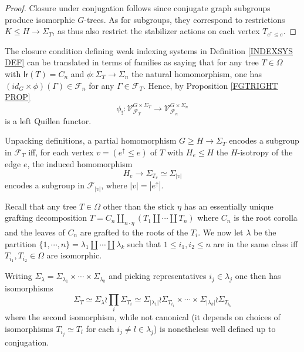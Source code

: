 \documentclass[a4paper,10pt]{article}%
\begin{document}
\begin{proof}
	Closure under conjugation follows since conjugate graph subgroups produce isomorphic $G$-trees.
	As for subgroups, they correspond to restrictions $K \leq H \to \Sigma_T$,
	as thus also restrict the stabilizer actions on each vertex $T_{e^{\uparrow} \leq e}$.
\end{proof}

\begin{remark}\label{LRLEFTQUILLEN REM}
The closure condition defining weak indexing systems in Definition \ref{INDEXSYS DEF}
can be translated in terms of families as saying that for any tree $T \in \Omega$ with $\mathsf{lr}(T)=C_n$ and 
$\phi \colon \Sigma_T \to \Sigma_n$ 
the natural homomorphism, one has
$(id_G \times \phi)(\Gamma) \in \mathcal{F}_n$
for any $\Gamma \in \mathcal{F}_{T}$. 
Hence, by
Proposition \ref{FGTRIGHT PROP} 
\[
	\phi_{!}
		\colon
	\mathcal{V}^{G \times \Sigma_T}_{\mathcal{F}_T}
		\to
	\mathcal{V}^{G \times \Sigma_n}
	_{\mathcal{F}_{n}}
\]
is a left Quillen functor.
\end{remark}


\begin{remark}\label{UNPACKFTYPE REM}
Unpacking definitions, a partial homomorphism 
$G \geq H \to \Sigma_T$
encodes a subgroup in $\mathcal{F}_T$
iff, for each vertex $v= ( e^{\uparrow} \leq e)$ of $T$ with 
$H_e \leq H$ the
$H$-isotropy of the edge $e$, the induced homomorphism
\begin{equation}\label{PARTIALHOMEDGE EQ}
H_e \to \Sigma_{T_{v}} \simeq 
\Sigma_{|v|}
\end{equation}
encodes a subgroup in $\mathcal{F}_{|v|}$, where $|v|=|e^{\uparrow}|$.
\end{remark}


\begin{remark}\label{TREEINDUCDESC REM}
Recall that any tree $T \in \Omega$ other than the stick $\eta$ has an essentially unique grafting decomposition
$T= C_n \amalg_{n \cdot \eta}(T_1 \amalg \cdots \amalg T_n)$ where $C_n$ is the root corolla and the leaves of $C_n$ are grafted to the roots of the $T_i$. We now let 
$\lambda$ be the partition 
$\{1,\cdots,n\} = \lambda_1 \amalg\cdots \amalg \lambda_k$
 such that $1 \leq i_1, i_2 \leq n$ are in the same class iff
 $T_{i_1}, T_{i_2} \in \Omega$ are isomorphic.
 
 Writing 
 $\Sigma_{\lambda} = \Sigma_{\lambda_1} \times \cdots \times
 \Sigma_{\lambda_k}$
and picking representatives $i_j \in \lambda_j$ 
one then has isomorphisms
\[
	\Sigma_T \simeq \Sigma_{\lambda} \wr \prod_{i} \Sigma_{T_i}
		\simeq
	\Sigma_{|\lambda_1|} \wr \Sigma_{T_{i_1}}
		\times \cdots \times	
	\Sigma_{|\lambda_k|} \wr \Sigma_{T_{i_k}}
\]
where the second isomorphism, while not canonical 
(it depends on choices of isomorphisms $T_{i_j} \simeq T_l$ for each $i_j \neq l \in \lambda_j$) is nonetheless well defined up to conjugation.
\end{remark}
\end{document}
